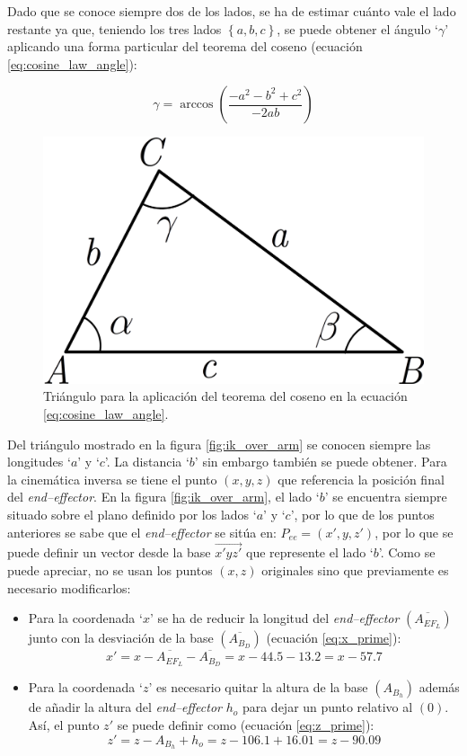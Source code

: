Dado que se conoce siempre dos de los lados, se ha de estimar cuánto vale el lado
restante ya que, teniendo los tres lados $\left\{a,b,c\right\}$, se puede obtener
el ángulo `$\gamma$' aplicando una forma particular del teorema del coseno
(ecuación \ref{eq:cosine_law_angle}):

\begin{equation}\label{eq:cosine_law_angle}
    \gamma = \arccos{\left(\frac{-a^2 - b^2 + c^2}{-2ab}\right)}
\end{equation}

\begin{figure}[H]
    \centering
    \includegraphics[width=.3\linewidth]{pictures/cosine_law.png}
    \caption{Triángulo para la aplicación del teorema del coseno en la ecuación \ref{eq:cosine_law_angle}.}
    \label{fig:cosine_law_triangle}
\end{figure}

Del triángulo mostrado en la figura \ref{fig:ik_over_arm} se conocen siempre las longitudes
`$a$' y `$c$'. La distancia `$b$' sin embargo también se puede obtener. Para la cinemática
inversa se tiene el punto $\left(x, y, z\right)$ que referencia la posición final del
\textit{end--effector}. En la figura \ref{fig:ik_over_arm}, el lado `$b$' se encuentra
siempre situado sobre el plano definido por los lados `$a$' y `$c$', por lo que de los puntos anteriores
se sabe que el \textit{end--effector} se sitúa en: $P_{ee} = \left(x', y, z'\right)$,
por lo que se puede definir un vector desde la base $\overrightarrow{x'yz'}$ que
represente el lado `$b$'. Como se puede apreciar, no se usan los puntos $\left(x, z\right)$
originales sino que previamente es necesario modificarlos:
\begin{itemize}
    \item Para la coordenada `$x$' se ha de reducir la longitud del \textit{end--effector}
          $\left(\overline{A_{EF_L}}\right)$ junto con la desviación de la base $\left(\overline{A_{B_D}}\right)$
          (ecuación \ref{eq:x_prime}):
          \begin{equation}\label{eq:x_prime}
              x' = x - \overline{A_{EF_L}} - \overline{A_{B_D}} = x - 44.5 - 13.2 = x - 57.7
          \end{equation}

    \item Para la coordenada `$z$' es necesario quitar la altura de la base $\left(A_{B_h}\right)$
          además de añadir la altura del \textit{end--effector} $h_o$ para dejar un punto
          relativo al $\left(0\right)$. Así, el punto $z'$ se puede definir
          como (ecuación \ref{eq:z_prime}):
          \begin{equation}\label{eq:z_prime}
              z' = z - A_{B_h} + h_o = z - 106.1 + 16.01 = z - 90.09
          \end{equation}
\end{itemize}

